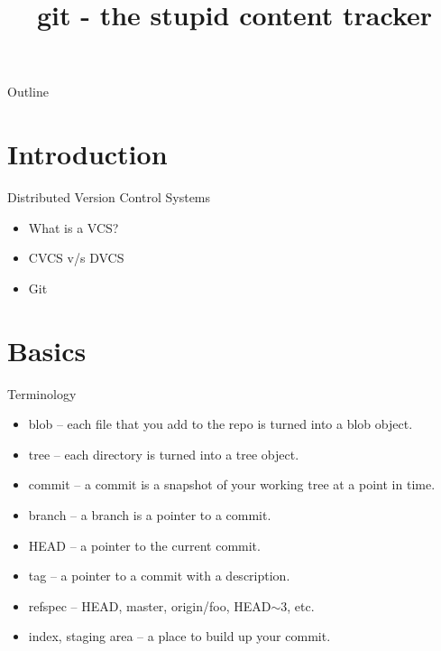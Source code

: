 \documentclass{beamer}
\title{git - the stupid content tracker}
\begin{document}
\begin{frame}
  \titlepage
\end{frame}

\begin{frame}{Outline}
  \tableofcontents
\end{frame}


\section{Introduction}

\begin{frame}{Distributed Version Control Systems}
  \begin{itemize}
  \item What is a VCS?
  \item CVCS v/s DVCS
  \item Git
  \end{itemize}
\end{frame}

\section{Basics}

\begin{frame}{Terminology}
  \begin{itemize}
  \item blob -- each file that you add to the repo is turned into a blob object.
  \item tree -- each directory is turned into a tree object.
  \item commit -- a commit is a snapshot of your working tree at a point in time.
  \item branch -- a branch is a pointer to a commit.
  \item HEAD -- a pointer to the current commit.
  \item tag -- a pointer to a commit with a description.
  \item refspec -- HEAD, master, origin/foo, HEAD$\sim$3, etc.
  \item index, staging area -- a place to build up your commit.
  \end{itemize}
\end{frame}
\end{document}
